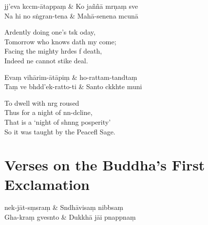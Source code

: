 \begin{twochants}
  jj'eva kccm-ātappaṃ & Ko jaññā mrṇaṃ sve \\
  Na hi no sṅgran-tena & Mahā-senena mcunā \\
\end{twochants}

\begin{english}
  Ardently doing one's tsk oday,\\
  Tomorrow who knows dath my come;\\
  Facing the mighty hrdes f death,\\
  Indeed ne cannot stike  deal.
\end{english}

\begin{twochants}
  Evaṃ vihārim-ātāpiṃ & ho-rattam-tandtaṃ \\
  Taṃ ve bhdd'ek-ratto-ti & Santo ckkhte muni \\
\end{twochants}

\begin{english}
  To dwell with nrg roused\\
  Thus for a night of nn-dcline,\\
  That is a `night of shnng posperity'\\
  So it was taught by the Peacefl Sage.
\end{english}

\chapter{Verses on the Buddha's First Exclamation}%

\begin{leader}
\end{leader}

\begin{twochants}
  nek-jāt-sṃsraṃ & Sndhāvisaṃ nibbsaṃ \\
  Gha-kraṃ gvesnto & Dukkhā jāi pnappnaṃ \\
\end{twochants}

